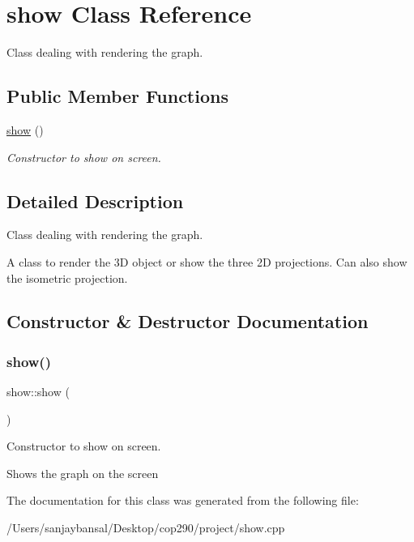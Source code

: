 \hypertarget{classshow}{}\section{show Class Reference}
\label{classshow}


Class dealing with rendering the graph.  


\subsection*{Public Member Functions}
\begin{DoxyCompactItemize}
\item 
\mbox{\hyperlink{classshow_a2312177bcc49d891bdb54ad114c33af6}{show}} ()
\begin{DoxyCompactList}\small\item\em Constructor to show on screen. \end{DoxyCompactList}\end{DoxyCompactItemize}


\subsection{Detailed Description}
Class dealing with rendering the graph. 

A class to render the 3D object or show the three 2D projections. Can also show the isometric projection. 

\subsection{Constructor \& Destructor Documentation}
\mbox{\label{classshow_a2312177bcc49d891bdb54ad114c33af6}} 
\subsubsection{\texorpdfstring{show()}{show()}}
{\footnotesize\ttfamily show\+::show (\begin{DoxyParamCaption}{ }\end{DoxyParamCaption})}



Constructor to show on screen. 

Shows the graph on the screen 

The documentation for this class was generated from the following file\+:\begin{DoxyCompactItemize}
\item 
/\+Users/sanjaybansal/\+Desktop/cop290/project/show.\+cpp\end{DoxyCompactItemize}
